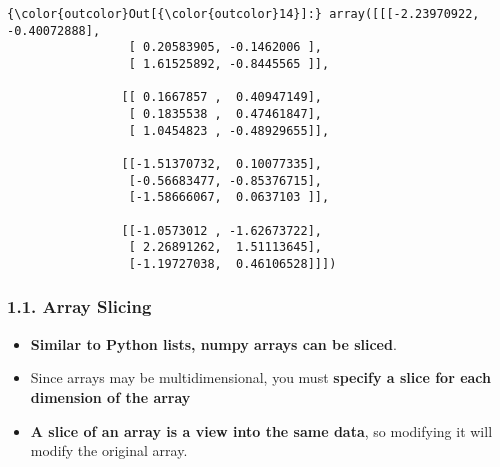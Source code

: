 \documentclass[11pt]{article}
\providecommand{\tightlist}{%
      \setlength{\itemsep}{0pt}\setlength{\parskip}{0pt}}
\begin{document}
\begin{Verbatim}[commandchars=\\\{\}]
{\color{outcolor}Out[{\color{outcolor}14}]:} array([[[-2.23970922, -0.40072888],
                 [ 0.20583905, -0.1462006 ],
                 [ 1.61525892, -0.8445565 ]],
         
                [[ 0.1667857 ,  0.40947149],
                 [ 0.1835538 ,  0.47461847],
                 [ 1.0454823 , -0.48929655]],
         
                [[-1.51370732,  0.10077335],
                 [-0.56683477, -0.85376715],
                 [-1.58666067,  0.0637103 ]],
         
                [[-1.0573012 , -1.62673722],
                 [ 2.26891262,  1.51113645],
                 [-1.19727038,  0.46106528]]])
\end{Verbatim}
            
    \hypertarget{array-slicing}{%
\subsubsection{1.1. Array Slicing}\label{array-slicing}}

\begin{itemize}
\tightlist
\item
  \textbf{Similar to Python lists, numpy arrays can be sliced}.
\item
  Since arrays may be multidimensional, you must \textbf{specify a slice
  for each dimension of the array}
\item
  \textbf{A slice of an array is a view into the same data}, so
  modifying it will modify the original array.
\end{itemize}
\end{document}
